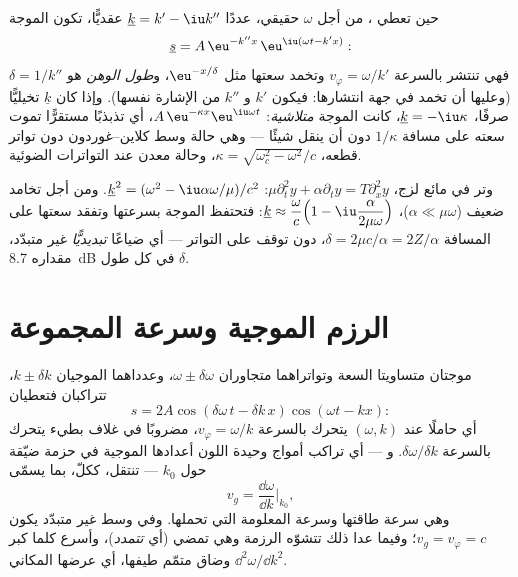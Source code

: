 \begin{definition}\label{def:b2:dispersion-wave-packets:complex}
حين تعطي ، من أجل $\omega$ حقيقي، عددًا
$\underline k = k' - \iu k''$ عقديًّا، تكون الموجة
\[
\underline s = A\,\eu^{-k''x}\,\eu^{\iu(\omega t - k'x)} :
\]
فهي تنتشر بالسرعة $v_\varphi = \omega/k'$ وتخمد سعتها مثل
$\eu^{-x/\delta}$، و\emph{طول الوهن} هو $\delta = 1/k''$ (وعليها أن
تخمد في جهة انتشارها: فيكون $k'$ و $k''$ من الإشارة نفسها).
وإذا كان $\underline k$ تخيليًّا صرفًا، $\underline k = -\iu\kappa$، كانت الموجة
\emph{متلاشية}: $A\,\eu^{-\kappa x}\eu^{\iu\omega t}$، أي تذبذبًا مستقرًّا
تموت سعته على مسافة $1/\kappa$ دون أن ينقل
شيئًا --- وهي حالة وسط كلاين--غوردون دون تواتر قطعه،
$\kappa = \sqrt{\omega_c^2 - \omega^2}/c$، وحالة معدن عند التواترات الضوئية.
\end{definition}

\begin{example}\label{ex:b2:dispersion-wave-packets:damped}
وتر في مائع لزج، $\mu\partial_t^2y + \alpha\partial_ty = T\partial_x^2y$:
$\underline k^2 = (\omega^2 - \iu\alpha\omega/\mu)/c^2$. ومن أجل تخامد ضعيف ($\alpha \ll \mu
\omega$)، $\underline k \approx \dfrac\omega c\Bigl(1 - \iu\dfrac{\alpha}{2\mu\omega}\Bigr)$: فتحتفظ الموجة
بسرعتها وتفقد سعتها على المسافة $\delta = 2\mu c/\alpha = 2Z/\alpha$،
دون توقف على التواتر --- أي ضياعًا \emph{تبديديًّا} غير متبدّد،
مقداره \qty{8.7}{dB} في كل طول $\delta$.
\end{example}

\section{الرزم الموجية وسرعة المجموعة}

\begin{proposition}\label{prop:b2:dispersion-wave-packets:group}
موجتان متساويتا السعة وتواتراهما متجاوران $\omega \pm
\delta\omega$، وعدداهما الموجيان $k \pm \delta k$، تتراكبان فتعطيان
\[
s = 2A\cos(\delta\omega\,t - \delta k\,x)\cos(\omega t - kx) :
\]
أي حاملًا عند $(\omega, k)$ يتحرك بالسرعة $v_\varphi = \omega/k$، مضروبًا في
غلاف بطيء يتحرك بالسرعة $\delta\omega/\delta k$. و\emph{} --- أي
تراكب أمواج وحيدة اللون أعدادها الموجية في حزمة ضيّقة
حول $k_0$ --- تنتقل، ككلّ، بما يسمّى \emph{}
\[
v_g = \frac{\dd\omega}{\dd k}\Bigr|_{k_0} ,
\]
وهي سرعة طاقتها وسرعة المعلومة التي تحملها.
وفي وسط غير متبدّد يكون $v_g = v_\varphi = c$؛ وفيما عدا ذلك تتشوّه
الرزمة وهي تمضي (أي \emph{تتمدد})، وأسرع كلما كبر
$\dd^2\omega/\dd k^2$ وضاق متمّم طيفها، أي عرضها
المكاني.
\end{proposition}


